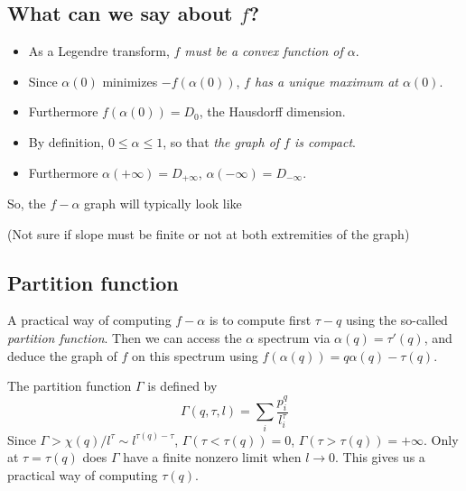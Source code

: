 \documentclass[11pt]{article}
\begin{document}
\subsection{What can we say about $f$?}
\begin{itemize}
	\item As a Legendre transform, \emph{$f$ must be a convex function of $\alpha$}.
	\item Since $\alpha(0)$ minimizes $- f(\alpha(0))$, \emph{$f$ has a unique maximum at $\alpha(0)$}.
	\item Furthermore $f(\alpha(0)) = D_0$, the Hausdorff dimension.
	\item By definition, $0 \leq \alpha \leq 1$, so that \emph{the graph of $f$ is compact}.
	\item Furthermore $\alpha(+\infty) = D_{+\infty}$, $\alpha(-\infty) = D_{-\infty}$.
\end{itemize}
So, the $f - \alpha$ graph will typically look like
\begin{center}
\end{center}
(Not sure if slope must be finite or not at both extremities of the graph)

\subsection{Partition function}

A practical way of computing $f - \alpha$ is to  compute first $\tau - q$ using the so-called \emph{partition function}. Then we can access the $\alpha$ spectrum via $\alpha(q) = \tau'(q)$, and deduce the graph of $f$ on this spectrum using $f(\alpha(q)) = q \alpha(q) - \tau(q)$.

The partition function $\Gamma$ is defined by
\begin{equation}
\boxed{
	\Gamma(q,\tau,l) = \sum_i \frac{p_i^q}{l_i^\tau}
}
\end{equation}
Since $\Gamma > \chi(q)/l^\tau \sim l^{\tau(q) - \tau}$, $\Gamma(\tau < \tau(q)) = 0$, $\Gamma(\tau > \tau(q)) = +\infty$. Only at $\tau = \tau(q)$ does $\Gamma$ have a finite nonzero limit when $l \rightarrow 0$. This gives us a practical way of computing $\tau(q)$.
\end{document}
